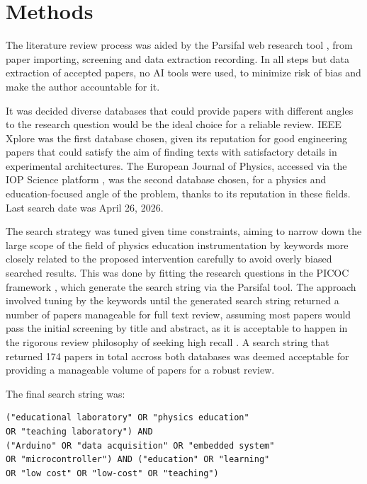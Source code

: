 \documentclass[12pt]{article}
\begin{document}
\section{Methods}

The literature review process was aided by the Parsifal web research tool \cite{parsifal}, from paper importing, screening and data extraction recording. In all steps but data extraction of accepted papers, no AI tools were used, to minimize risk of bias and make the author accountable for it.

It was decided diverse databases that could provide papers with different angles to the research question would be the ideal choice for a reliable review. IEEE Xplore \cite{ieee} was the first database chosen, given its reputation for good engineering papers that could satisfy the aim of finding texts with satisfactory details in experimental architectures. The European Journal of Physics, accessed via the IOP Science platform \cite{iop}, was the second database chosen, for a physics and education-focused angle of the problem, thanks to its reputation in these fields. Last search date was April 26, 2026.

The search strategy was tuned given time constraints, aiming to narrow down the large scope of the field of physics education instrumentation by keywords more closely related to the proposed intervention carefully to avoid overly biased searched results. This was done by fitting the research questions in the PICOC framework \cite{wohlin2012experimentation}, which generate the search string via the Parsifal tool. The approach involved tuning by the keywords until the generated search string returned a number of papers manageable for full text review, assuming most papers would pass the initial screening by title and abstract, as it is acceptable to happen in the rigorous review philosophy of seeking high recall \cite{cochrane_handbook_2024}. A search string that returned 174 papers in total accross both databases was deemed acceptable for providing a manageable volume of papers for a robust review.

The final search string was:

\begin{verbatim}
("educational laboratory" OR "physics education" 
OR "teaching laboratory") AND 
("Arduino" OR "data acquisition" OR "embedded system" 
OR "microcontroller") AND ("education" OR "learning" 
OR "low cost" OR "low-cost" OR "teaching")
\end{verbatim}
\end{document}
